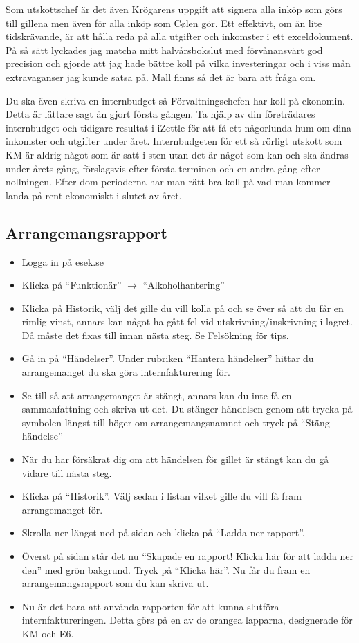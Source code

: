 \documentclass[10pt]{article}
\begin{document}
Som utskottschef är det även Krögarens uppgift att signera alla inköp som görs till gillena men även för alla inköp som Cølen gör. Ett effektivt, om än lite tidskrävande, är att hålla reda på alla utgifter och inkomster i ett exceldokument. På så sätt lyckades jag matcha mitt halvårsbokslut med förvånansvärt god precision och gjorde att jag hade bättre koll på vilka investeringar och i viss mån extravaganser jag kunde satsa på. Mall finns så det är bara att fråga om.

Du ska även skriva en internbudget så Förvaltningschefen har koll på ekonomin. Detta är lättare sagt än gjort första gången. Ta hjälp av din företrädares internbudget och tidigare resultat i iZettle för att få ett någorlunda hum om dina inkomster och utgifter under året. Internbudgeten för ett så rörligt utskott som KM är aldrig något som är satt i sten utan det är något som kan och ska ändras under årets gång, förslagsvis efter första terminen och en andra gång efter nollningen. Efter dom perioderna har man rätt bra koll på vad man kommer landa på rent ekonomiskt i slutet av året.

\subsection{Arrangemangsrapport}
\begin{itemize}
	\item Logga in på esek.se
    \item Klicka på ``Funktionär'' $\rightarrow$ ``Alkoholhantering''
    \item Klicka på Historik, välj det gille du vill kolla på och se över så att du får en
rimlig vinst, annars kan något ha gått fel vid utskrivning/inskrivning i lagret. Då
måste det fixas till innan nästa steg. Se Felsökning för tips.
	\item Gå in på ``Händelser''. Under rubriken ``Hantera händelser'' hittar du arrangemanget du ska göra internfakturering för.
    \item Se till så att arrangemanget är stängt, annars kan du inte få en
sammanfattning och skriva ut det. Du stänger händelsen genom att trycka på
symbolen längst till höger om arrangemangsnamnet och tryck på ``Stäng händelse''
	\item När du har försäkrat dig om att händelsen för gillet är stängt kan du gå vidare
till nästa steg.
	\item Klicka på ``Historik''. Välj sedan i listan vilket gille du vill få fram arrangemanget för.
    \item Skrolla ner längst ned på sidan och klicka på ``Ladda ner rapport''.
    \item Överst på sidan står det nu ``Skapade en rapport! Klicka här för att ladda ner
den'' med grön bakgrund. Tryck på ``Klicka här''. Nu får du fram en arrangemangsrapport som du kan skriva ut.
    \item Nu är det bara att använda rapporten för att kunna slutföra internfaktureringen. Detta görs på en av de orangea lapparna, designerade för KM och E6.

\end{itemize}
\end{document}
